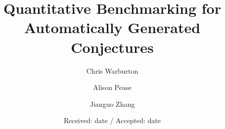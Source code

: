 \newcommand{\iE}{\textbf{E}}
\newcommand{\iN}{\textbf{N}}
\newcommand{\iS}{\textbf{S}}
\newcommand{\iA}{\textbf{A}}
\newcommand{\iC}{\textbf{C}}
\newcommand{\iU}{\textbf{U}}
\newcommand{\tIFF}{if-and-only-if}
\newcommand{\tNE}{non-exists}
\newcommand{\tIMP}{implies}
\newcommand{\tEQ}{equations}
\newcommand{\tINE}{inequalities}
\newcommand{\tCON}{conditional}
\newcommand{\tRow}[1]{#1 \\ \hline}




\title{Quantitative Benchmarking for Automatically Generated Conjectures%
}


\author{Chris Warburton \and
        Alison Pease    \and
        Jianguo Zhang}



\date{Received: date / Accepted: date}

\maketitle



